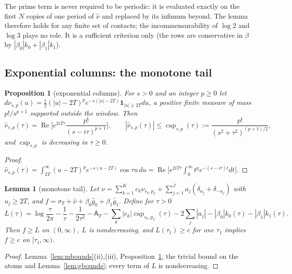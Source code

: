 \documentclass[10pt]{amsart}
\newtheorem{proposition}[theorem]{Proposition}
\newtheorem{lemma}[theorem]{Lemma}
\theoremstyle{definition}
\theoremstyle{remark}
\newcommand{\Rel}{\operatorname{Re}}
\newcommand{\sT}{\sigma_T}
\newcommand{\gh}[1]{\widehat g_{#1}}
\newcommand{\nuh}{\widehat\nu}
\newcommand{\Aconst}{\mathsf A_T}
\begin{document}
The prime term is never required to be periodic: it is evaluated exactly on the first $N$
copies of one period of $\nuh$ and replaced by its infimum beyond. The lemma therefore holds
for any finite set of contacts; the incommensurability of $\log2$ and $\log3$ plays no role.
It is a sufficient criterion only (the rows are conservative in $\beta$ by
$|\beta_0|k_0+|\beta_1|k_1$).

\subsection{Exponential columns: the monotone tail}

\begin{proposition}[exponential columns]\label{prop:T0}
For $s>0$ and an integer $p\ge0$ let $d\nu_{s,p}(u)=\frac12(|u|-2T)^pe^{-s(|u|-2T)}\mathbf 1_{|u|\ge2T}du$,
a positive finite measure of mass $p!/s^{p+1}$ supported outside the window. Then
\[
\nuh_{s,p}(\tau)=\Rel\Big[e^{2iT\tau}\frac{p!}{(s-i\tau)^{p+1}}\Big],\qquad
|\nuh_{s,p}(\tau)|\le\operatorname{cap}_{s,p}(\tau):=\frac{p!}{(s^2+\tau^2)^{(p+1)/2}},
\]
and $\operatorname{cap}_{s,p}$ is decreasing in $\tau\ge0$.
\end{proposition}
\begin{proof}
$\nuh_{s,p}(\tau)=\int_{2T}^\infty(u-2T)^pe^{-s(u-2T)}\cos\tau u\,du=\Rel\big[e^{2iT\tau}\int_0^\infty t^pe^{-(s-i\tau)t}dt\big]$.
\end{proof}

\begin{lemma}[monotone tail]\label{lem:T}
Let $\nu=\sum_{k=1}^Kc_k\nu_{s_k,p_k}+\sum_{j=1}^Ja_j(\delta_{u_j}+\delta_{-u_j})$ with $u_j\ge2T$, and
$f=\sT+\nuh+\beta_0\gh0+\beta_1\gh1$. Define for $\tau>0$
\[
L(\tau)=\log\frac\tau{2\pi}-\frac1\tau-\frac1{2\tau^2}-\Aconst-\sum_k|c_k|\operatorname{cap}_{s_k,p_k}(\tau)
-2\sum_j|a_j|-|\beta_0|k_0(\tau)-|\beta_1|k_1(\tau).
\]
Then $f\ge L$ on $(0,\infty)$, $L$ is nondecreasing, and $L(\tau_1)\ge c$ for one $\tau_1$ implies
$f\ge c$ on $[\tau_1,\infty)$.
\end{lemma}
\begin{proof}
Lemma~\ref{lem:mbounds}(ii),(iii), Proposition~\ref{prop:T0}, the trivial bound on the atoms and
Lemma~\ref{lem:gbounds}; every term of $L$ is nondecreasing.
\end{proof}
\end{document}
